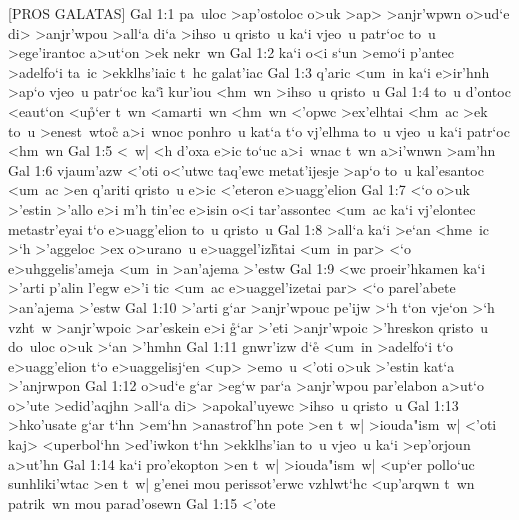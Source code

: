 [PROS GALATAS]
\vs Gal 1:1
pa~uloc
>ap'ostoloc
o>uk
>ap>
>anjr'wpwn
o>ud`e
di>
>anjr'wpou
>all`a
di`a
>ihso~u
qristo~u
ka`i
vjeo~u
patr`oc
to~u
>ege'irantoc
a>ut`on
>ek
nekr~wn\bibvsend
\vs Gal 1:2
ka`i
o<i
s`un
>emo`i
p'antec
>adelfo`i
ta~ic
>ekklhs'iaic
t~hc
galat'iac\bibvsend
\vs Gal 1:3
q'aric
<um~in
ka`i
e>ir'hnh
>ap`o
vjeo~u
patr`oc
ka`i\r{}
kur'iou
<hm~wn
>ihso~u
qristo~u\bibvsend
\vs Gal 1:4
to~u
d'ontoc
<eaut`on
<u\r{p}`er
t~wn
<amarti~wn
<hm~wn
<'opwc
>ex'elhtai
<hm~ac
>ek
to~u
>enest~wtoc\r{}
a>i~wnoc
ponhro~u
kat`a
t`o
vj'elhma
to~u
vjeo~u
ka`i
patr`oc
<hm~wn\bibvsend
\vs Gal 1:5
<~w|
<h
d'oxa
e>ic
to`uc
a>i~wnac
t~wn
a>i'wnwn
>am'hn\bibvsend
\vs Gal 1:6
vjaum'azw
<'oti
o<'utwc
taq'ewc
metat'ijesje
>ap`o
to~u
kal'esantoc
<um~ac
>en
q'ariti
qristo~u
e>ic
<'eteron
e>uagg'elion\bibvsend
\vs Gal 1:7
<`o
o>uk
>'estin
>'allo
e>i
m'h
tin'ec
e>isin
o<i
tar'assontec
<um~ac
ka`i
vj'elontec
metastr'eyai
t`o
e>uagg'elion
to~u
qristo~u\bibvsend
\vs Gal 1:8
>all`a
ka`i
>e`an
<hme~ic
>`h
>'aggeloc
>ex
o>urano~u
e>uaggel'iz\r{h}tai
<um~in
par>
<`o
e>uhggelis'ameja
<um~in
>an'ajema
>'estw\bibvsend
\vs Gal 1:9
<wc
proeir'hkamen
ka`i
>'arti
p'alin
l'egw
e>'i
tic
<um~ac
e>uaggel'izetai
par>
<`o
parel'abete
>an'ajema
>'estw\bibvsend
\vs Gal 1:10
>'arti
g`ar
>anjr'wpouc
pe'ijw
>`h
t`on
vje`on
>`h
vzht~w
>anjr'wpoic
>ar'eskein
e>i
\r{g}`ar
>'eti
>anjr'wpoic
>'hreskon
qristo~u
do~uloc
o>uk
>`an
>'hmhn\bibvsend
\vs Gal 1:11
gnwr'izw
d`e\r{}
<um~in
>adelfo`i
t`o
e>uagg'elion
t`o
e>uaggelisj`en
<up>
>emo~u
<'oti
o>uk
>'estin
kat`a
>'anjrwpon\bibvsend
\vs Gal 1:12
o>ud`e
g`ar
>eg`w
par`a
>anjr'wpou
par'elabon
a>ut`o
o>'ute
>edid'aqjhn
>all`a
di>
>apokal'uyewc
>ihso~u
qristo~u\bibvsend
\vs Gal 1:13
>hko'usate
g`ar
t`hn
>em`hn
>anastrof'hn
pote
>en
t~w|
>iouda"ism~w|
<'oti
kaj>
<uperbol`hn
>ed'iwkon
t`hn
>ekklhs'ian
to~u
vjeo~u
ka`i
>ep'orjoun
a>ut'hn\bibvsend
\vs Gal 1:14
ka`i
pro'ekopton
>en
t~w|
>iouda"ism~w|
<up`er
pollo`uc
sunhliki'wtac
>en
t~w|
g'enei
mou
perissot'erwc
vzhlwt`hc
<up'arqwn
t~wn
patrik~wn
mou
parad'osewn\bibvsend
\vs Gal 1:15
<'ote
